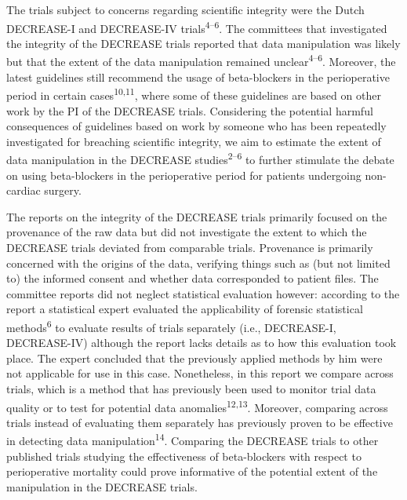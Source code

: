 \documentclass[]{article}
\begin{document}
The trials subject to concerns regarding scientific integrity were the
Dutch DECREASE-I and DECREASE-IV trials\textsuperscript{4--6}. The
committees that investigated the integrity of the DECREASE trials
reported that data manipulation was likely but that the extent of the
data manipulation remained unclear\textsuperscript{4--6}. Moreover, the
latest guidelines still recommend the usage of beta-blockers in the
perioperative period in certain cases\textsuperscript{10,11}, where some
of these guidelines are based on other work by the PI of the DECREASE
trials. Considering the potential harmful consequences of guidelines
based on work by someone who has been repeatedly investigated for
breaching scientific integrity, we aim to estimate the extent of data
manipulation in the DECREASE studies\textsuperscript{2--6} to further
stimulate the debate on using beta-blockers in the perioperative period
for patients undergoing non-cardiac surgery.

The reports on the integrity of the DECREASE trials primarily focused on
the provenance of the raw data but did not investigate the extent to
which the DECREASE trials deviated from comparable trials. Provenance is
primarily concerned with the origins of the data, verifying things such
as (but not limited to) the informed consent and whether data
corresponded to patient files. The committee reports did not neglect
statistical evaluation however: according to the report a statistical
expert evaluated the applicability of forensic statistical
methods\textsuperscript{6} to evaluate results of trials separately
(i.e., DECREASE-I, DECREASE-IV) although the report lacks details as to
how this evaluation took place. The expert concluded that the previously
applied methods by him were not applicable for use in this case.
Nonetheless, in this report we compare across trials, which is a method
that has previously been used to monitor trial data quality or to test
for potential data anomalies\textsuperscript{12,13}. Moreover, comparing
across trials instead of evaluating them separately has previously
proven to be effective in detecting data
manipulation\textsuperscript{14}. Comparing the DECREASE trials to other
published trials studying the effectiveness of beta-blockers with
respect to perioperative mortality could prove informative of the
potential extent of the manipulation in the DECREASE trials.
\end{document}
